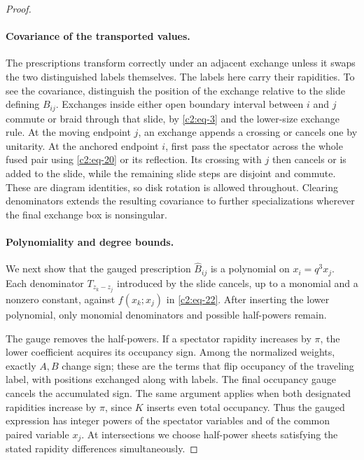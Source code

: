 \begin{proof}
\paragraph{Covariance of the transported values.}
The prescriptions transform correctly under an adjacent exchange unless
it swaps the two distinguished labels themselves. The labels here carry
their rapidities. To see the covariance, distinguish the position of the
exchange relative to the slide defining \(B_{ij}\).
Exchanges inside either open boundary interval between \(i\) and \(j\)
commute or braid through that slide, by \eqref{c2:eq-3} and the
lower-size exchange rule. At the moving endpoint \(j\), an exchange
appends a crossing or cancels one by unitarity. At the anchored endpoint
\(i\), first pass the spectator across the whole fused pair using
\eqref{c2:eq-20} or its reflection. Its crossing with \(j\) then
cancels or is added to the slide, while the remaining slide steps are
disjoint and commute. These are diagram identities, so disk rotation is
allowed throughout. Clearing denominators extends the resulting
covariance to further specializations wherever the final exchange box is
nonsingular.

\paragraph{Polynomiality and degree bounds.}
We next show that the gauged prescription \(\widehat B_{ij}\) is a
polynomial on \(x_i=q^3x_j\). Each denominator
\(T_{z_k-z_j}\) introduced by the slide cancels, up to a monomial and
a nonzero constant, against \(f(x_k;x_j)\) in \eqref{c2:eq-22}.
After inserting the lower polynomial, only monomial denominators and
possible half-powers remain.

The gauge removes the half-powers. If a spectator rapidity increases
by \(\pi\), the lower coefficient acquires its occupancy sign. Among
the normalized weights, exactly \(A,B\) change sign; these are the
terms that flip occupancy of the traveling label, with positions
exchanged along with labels. The final occupancy gauge cancels the
accumulated sign. The same argument applies when both designated
rapidities increase by \(\pi\), since \(K\) inserts even total
occupancy. Thus the gauged expression has integer powers of the
spectator variables and of the common paired variable \(x_j\).
At intersections we choose half-power sheets satisfying the stated
rapidity differences simultaneously.


\end{proof}

